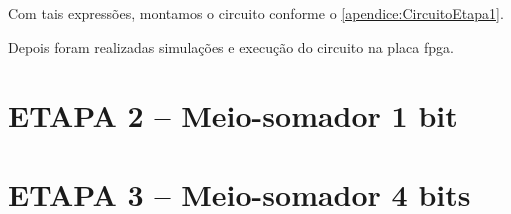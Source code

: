 		Com tais expressões, montamos o circuito conforme o \autoref{apendice:CircuitoEtapa1}.

		Depois foram realizadas simulações e execução do circuito na placa \ac{fpga}.

	\section{ETAPA 2 – Meio-somador 1 bit}

	\section{ETAPA 3 – Meio-somador 4 bits}








